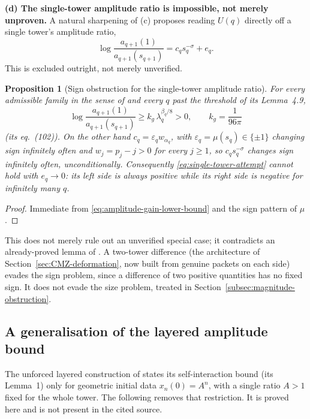 \documentclass[11pt]{amsart}
\numberwithin{equation}{section}
\theoremstyle{plain}
\newtheorem{proposition}[theorem]{Proposition}
\theoremstyle{definition}
\theoremstyle{remark}
\begin{document}
\textbf{(d) The single-tower amplitude ratio is impossible, not merely
unproven.}  A natural sharpening of (c) proposes reading $U(q)$ directly off
a single tower's amplitude ratio,
\begin{equation}
\log\frac{a_{q+1}(1)}{a_{q+1}(s_{q+1})}
=c_qs_q^{-\sigma}+e_q.
\label{eq:single-tower-attempt}
\end{equation}
This is excluded outright, not merely unverified.

\begin{proposition}[Sign obstruction for the single-tower amplitude ratio]
\label{prop:sign-obstruction}
For every admissible family in the sense of
\cite{AlpogeBuckmasterCoiculescu2026} and every $q$ past the threshold of
its Lemma~4.9,
\begin{equation}
\log\frac{a_{q+1}(1)}{a_{q+1}(s_{q+1})}\ge k_g\,\lambda_q^{\beta_q/8}>0,
\qquad k_g=\frac1{96\pi}
\label{eq:amplitude-gain-lower-bound}
\end{equation}
(its eq.~(102)).  On the other hand $c_q=\varepsilon_qw_{\alpha_q}$, with
$\varepsilon_q=\mu(s_q)\in\{\pm1\}$ changing sign infinitely often and
$w_j=p_j-j>0$ for every $j\ge1$, so $c_qs_q^{-\sigma}$ changes sign
infinitely often, unconditionally.  Consequently
\eqref{eq:single-tower-attempt} cannot hold with $e_q\to0$: its left side is
always positive while its right side is negative for infinitely many $q$.
\end{proposition}

\begin{proof}
Immediate from \eqref{eq:amplitude-gain-lower-bound} and the sign pattern
of $\mu$.
\end{proof}

This does not merely rule out an unverified special case; it contradicts an
already-proved lemma of \cite{AlpogeBuckmasterCoiculescu2026}.  A two-tower
difference (the architecture of Section~\ref{sec:CMZ-deformation}, now built
from genuine packets on each side) evades the sign problem, since a
difference of two positive quantities has no fixed sign.  It does not evade
the size problem, treated in Section~\ref{subsec:magnitude-obstruction}.

\subsection{A generalisation of the layered amplitude bound}
\label{subsec:generalised-lemma}

The unforced layered construction of \cite{CordobaMartinezZoroaZheng2023}
states its self-interaction bound (its Lemma~1) only for geometric initial
data $x_n(0)=A^n$, with a single ratio $A>1$ fixed for the whole tower.  The
following removes that restriction.  It is proved here and is not present in
the cited source.
\end{document}
